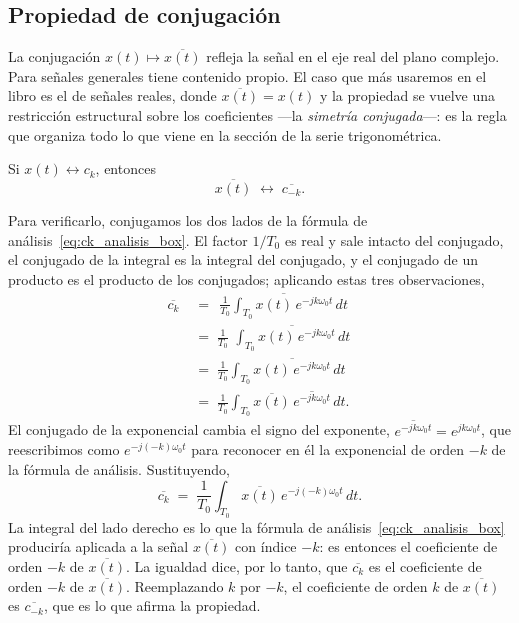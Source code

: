 \documentclass[class=book, crop=false]{standalone}
\begin{document}
\subsection{Propiedad de conjugación}
\label{subsec:prop_conjugacion}

La conjugación $x(t) \mapsto \overline{x(t)}$ refleja la señal en
el eje real del plano complejo. Para señales generales tiene
contenido propio. El caso que más usaremos en el libro es el de
señales reales, donde $\overline{x(t)} = x(t)$ y la propiedad se
vuelve una restricción estructural sobre los coeficientes ---la
\emph{simetría conjugada}---: es la regla que organiza todo lo que
viene en la sección de la serie trigonométrica.

\begin{resultado}[Conjugación]
Si $x(t)\leftrightarrow c_k$, entonces
\begin{equation}
    \overline{x(t)} \;\longleftrightarrow\; \overline{c_{-k}}.
    \label{eq:prop_conjugacion}
\end{equation}
\end{resultado}

Para verificarlo, conjugamos los dos lados de la fórmula de
análisis~\eqref{eq:ck_analisis_box}. El factor $1/T_0$ es real y
sale intacto del conjugado, el conjugado de la integral es la
integral del conjugado, y el conjugado de un producto es el producto
de los conjugados; aplicando estas tres observaciones,
\begin{align*}
    \overline{c_k}
    &\;=\; \overline{\,\frac{1}{T_0}\int_{T_0} x(t)\,e^{-jk\omega_0 t}\,dt\,} \\
    &\;=\; \frac{1}{T_0}\,\overline{\,\int_{T_0} x(t)\,e^{-jk\omega_0 t}\,dt\,} \\
    &\;=\; \frac{1}{T_0}\int_{T_0} \overline{x(t)\,e^{-jk\omega_0 t}}\,dt \\
    &\;=\; \frac{1}{T_0}\int_{T_0} \overline{x(t)}\,\overline{e^{-jk\omega_0 t}}\,dt.
\end{align*}
El conjugado de la exponencial cambia el signo del exponente,
$\overline{e^{-jk\omega_0 t}} = e^{jk\omega_0 t}$, que reescribimos
como $e^{-j(-k)\omega_0 t}$ para reconocer en él la exponencial de
orden $-k$ de la fórmula de análisis. Sustituyendo,
\begin{equation*}
    \overline{c_k}
    \;=\; \frac{1}{T_0}\int_{T_0}\overline{x(t)}\,e^{-j(-k)\omega_0 t}\,dt.
\end{equation*}
La integral del lado derecho es lo que la fórmula de
análisis~\eqref{eq:ck_analisis_box} produciría aplicada a la señal
$\overline{x(t)}$ con índice $-k$: es entonces el coeficiente de
orden $-k$ de $\overline{x(t)}$. La igualdad dice, por lo tanto, que
$\overline{c_k}$ es el coeficiente de orden $-k$ de $\overline{x(t)}$.
Reemplazando $k$ por $-k$, el coeficiente de orden $k$ de
$\overline{x(t)}$ es $\overline{c_{-k}}$, que es lo que afirma la
propiedad.
\end{document}
